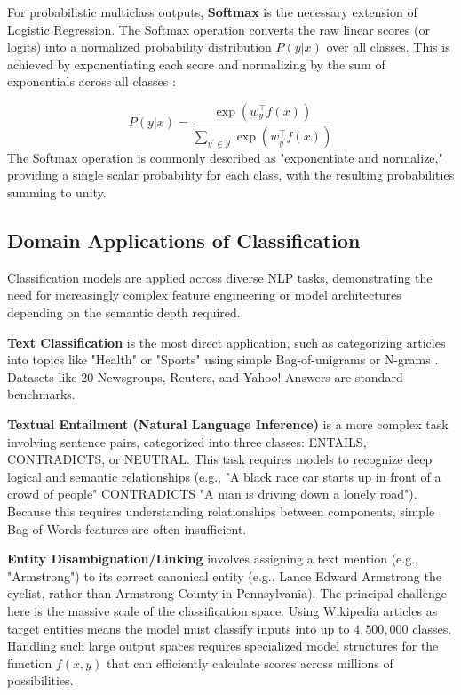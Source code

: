 \documentclass{article}
\begin{document}
For probabilistic multiclass outputs, \textbf{Softmax} is the necessary extension of Logistic Regression. The Softmax operation converts the raw linear scores (or logits) into a normalized probability distribution $P(y|x)$ over all classes. This is achieved by exponentiating each score and normalizing by the sum of exponentials across all classes :

\begin{equation*}
P(y|x)=\frac{\exp(w_{y}^{\top}f(x))}{\sum_{y^{\prime}\in\mathcal{Y}}\exp(w_{y^{\prime}}^{\top}f(x))}
\end{equation*}
The Softmax operation is commonly described as "exponentiate and normalize," providing a single scalar probability for each class, with the resulting probabilities summing to unity.

\subsection{Domain Applications of Classification}

Classification models are applied across diverse NLP tasks, demonstrating the need for increasingly complex feature engineering or model architectures depending on the semantic depth required.

\textbf{Text Classification} is the most direct application, such as categorizing articles into topics like "Health" or "Sports" using simple Bag-of-unigrams or N-grams . Datasets like 20 Newsgroups, Reuters, and Yahoo! Answers are standard benchmarks.

\textbf{Textual Entailment (Natural Language Inference)} is a more complex task involving sentence pairs, categorized into three classes: ENTAILS, CONTRADICTS, or NEUTRAL. This task requires models to recognize deep logical and semantic relationships (e.g., "A black race car starts up in front of a crowd of people" CONTRADICTS "A man is driving down a lonely road"). Because this requires understanding relationships between components, simple Bag-of-Words features are often insufficient.

\textbf{Entity Disambiguation/Linking} involves assigning a text mention (e.g., "Armstrong") to its correct canonical entity (e.g., Lance Edward Armstrong the cyclist, rather than Armstrong County in Pennsylvania). The principal challenge here is the massive scale of the classification space. Using Wikipedia articles as target entities means the model must classify inputs into up to $4,500,000$ classes. Handling such large output spaces requires specialized model structures for the function $f(x,y)$ that can efficiently calculate scores across millions of possibilities.
\end{document}
